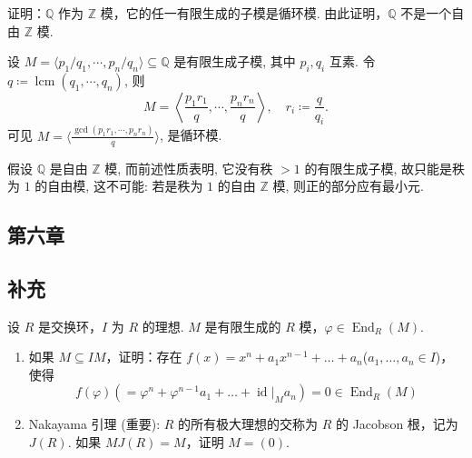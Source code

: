 \setcounter{pb}{20}
\begin{problem}
    证明：$ \mathbb{Q} $ 作为 $ \mathbb{Z} $ 模，它的任一有限生成的子模是循环模. 由此证明，$ \mathbb{Q} $ 不是一个自由 $ \mathbb{Z} $ 模. 
\end{problem}

\begin{solution}
    设 $M=\langle p_{1}/q_{1},\cdots,p_{n}/q_{n} \rangle \subseteq \mathbb{Q}$ 是有限生成子模, 其中 $p_{i},q_{i}$ 互素. 
    令 $q \coloneqq \operatorname{lcm}(q_{1},\cdots,q_{n})$, 则
        \[
            M=\left\langle \frac{p_{1}r_{1}}{q},\cdots,\frac{p_{n}r_{n}}{q} \right\rangle,\quad r_{i}\coloneqq \frac{q}{q_{i}}.
        \]
    可见 $M=\bigl\langle \frac{\gcd({p_{1}r_{1}},\cdots,{p_{n}r_{n}})}{q} \bigr\rangle$, 是循环模.
    \par 假设 $\mathbb{Q}$ 是自由 $\mathbb{Z}$ 模, 而前述性质表明, 它没有秩 $>1$ 的有限生成子模, 故只能是秩为 $1$ 的自由模, 这不可能: 若是秩为 $1$ 的自由 $\mathbb{Z}$ 模, 则正的部分应有最小元.
\end{solution}

\subsection{第六章}

\subsection{补充}

\setcounter{pb}{3}
\begin{problem}
    设 $ R $ 是交换环，$ I $ 为 $ R $ 的理想. $ M $ 是有限生成的 $ R $ 模，$ \varphi \in \operatorname{End}_R(M) $. 
    \begin{enumerate}[label=(\arabic*)]
        \item 如果 $ M \subseteq IM $，证明：存在 $ f(x) = x^n + a_1 x^{n-1} + \dots + a_n $($ a_1, \dots, a_n \in I $)，使得
              \[
                  f(\varphi) (= \varphi^n + \varphi^{n-1} a_1 + \dots + \operatorname{id} |_M a_n) = 0 \in \operatorname{End}_R(M)
              \]
        \item Nakayama 引理 (重要): $ R $ 的所有极大理想的交称为 $ R $ 的 Jacobson 根，记为 $ J(R) $. 如果 $ M J(R) = M $，证明 $ M = (0) $. 
    \end{enumerate}
\end{problem}


